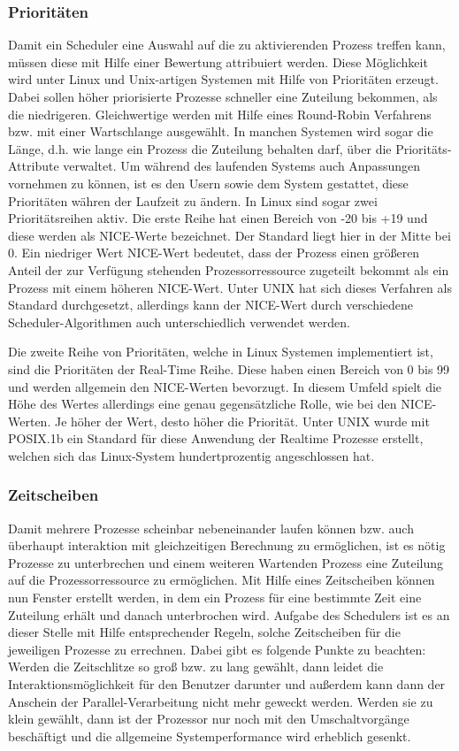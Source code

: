 \subsubsection{Prioritäten}
Damit ein Scheduler eine Auswahl auf die zu aktivierenden Prozess treffen kann, müssen diese mit Hilfe einer Bewertung attribuiert werden. Diese Möglichkeit wird unter Linux und Unix-artigen Systemen mit Hilfe von Prioritäten erzeugt.
Dabei sollen höher priorisierte Prozesse schneller eine Zuteilung bekommen, als die niedrigeren. Gleichwertige werden mit Hilfe eines Round-Robin Verfahrens bzw. mit einer Wartschlange ausgewählt. In manchen Systemen wird sogar die Länge, d.h. wie lange ein Prozess die Zuteilung behalten darf, über die Prioritäts-Attribute verwaltet. Um während des laufenden Systems auch Anpassungen vornehmen zu können, ist es den Usern sowie dem System gestattet, diese Prioritäten währen der Laufzeit zu ändern.
In Linux sind sogar zwei Prioritäts\-reihen aktiv. Die erste Reihe hat einen Bereich von -20 bis +19 und diese werden als NICE-Werte bezeichnet. Der Standard liegt hier in der Mitte bei 0. Ein niedriger Wert NICE-Wert bedeutet, dass der Prozess einen größeren Anteil der zur Verfügung stehenden Prozessorressource zugeteilt bekommt als ein Prozess mit einem höheren NICE-Wert.
Unter UNIX hat sich dieses Verfahren als Standard durchgesetzt, allerdings kann der NICE-Wert durch verschiedene Scheduler-Algorithmen auch unterschiedlich verwendet werden.

Die zweite Reihe von Prioritäten, welche in Linux Systemen implementiert ist, sind die Prioritäten der Real-Time Reihe. Diese haben einen Bereich von 0 bis 99 und werden allgemein den NICE-Werten bevorzugt. In diesem Umfeld spielt die Höhe des Wertes allerdings eine genau gegensätzliche Rolle,  wie bei den NICE-Werten. Je höher der Wert, desto höher die Priorität. Unter UNIX wurde mit POSIX.1b ein Standard für diese Anwendung der Realtime Prozesse erstellt, welchen sich das Linux-System hundertprozentig angeschlossen hat.

\subsubsection{Zeitscheiben}
Damit mehrere Prozesse scheinbar nebeneinander laufen können bzw. auch überhaupt interaktion mit gleichzeitigen Berechnung zu ermöglichen, ist es nötig Prozesse zu unterbrechen und einem weiteren Wartenden Prozess eine Zuteilung auf die Prozessorressource zu ermöglichen. Mit Hilfe eines Zeitscheiben können nun Fenster erstellt werden, in dem ein Prozess für eine bestimmte Zeit eine Zuteilung erhält und danach unterbrochen wird.
Aufgabe des Schedulers ist es an dieser Stelle mit Hilfe entsprechender Regeln, solche Zeitscheiben  für die jeweiligen Prozesse zu errechnen. Dabei gibt es folgende Punkte zu beachten:
Werden die Zeitschlitze so groß bzw. zu lang gewählt, dann leidet die Interaktionsmöglichkeit für den Benutzer darunter und außerdem kann dann der Anschein der Parallel-Verarbeitung nicht mehr geweckt werden.
Werden sie zu klein gewählt, dann ist der Prozessor nur noch mit den Umschaltvorgänge beschäftigt und die allgemeine Systemperformance wird erheblich gesenkt.

